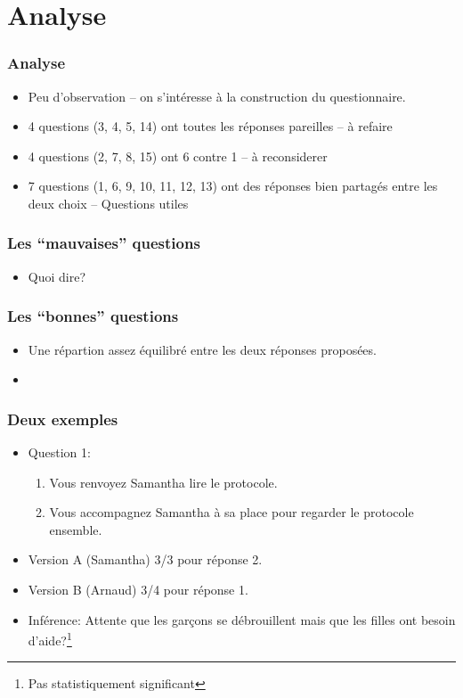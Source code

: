 \documentclass{beamer}
\begin{document}
\section{Analyse}
\begin{frame}
  \frametitle{Analyse}
  \begin{itemize}
  \item Peu d'observation -- on s'intéresse à la construction du questionnaire.
  \item 4 questions (3, 4, 5, 14) ont toutes les réponses pareilles -- à refaire
  \item 4 questions (2, 7, 8, 15) ont 6 contre 1 -- à reconsiderer
  \item 7 questions (1, 6, 9, 10, 11, 12, 13) ont des réponses bien partagés
    entre les deux choix -- Questions utiles
  \end{itemize}
\end{frame}

\begin{frame}
  \frametitle{Les ``mauvaises'' questions}
  \begin{itemize}
  \item Quoi dire?
  \end{itemize}
\end{frame}

\begin{frame}
  \frametitle{Les ``bonnes'' questions}
  \begin{itemize}
  \item Une répartion assez équilibré entre les deux réponses proposées.
  \item 
  \end{itemize}
\end{frame}

\begin{frame}
  \frametitle{Deux exemples}
  \begin{itemize}
  \item Question 1:
    \begin{enumerate}
    \item Vous renvoyez Samantha lire le protocole. 
    \item Vous accompagnez Samantha à sa place pour regarder le protocole ensemble. 
    \end{enumerate}
  \item Version A (Samantha) 3/3 pour réponse 2.
  \item Version B (Arnaud) 3/4 pour réponse 1.
  \item Inférence: Attente que les garçons se débrouillent mais que les filles ont
    besoin d'aide?\footnote{Pas statistiquement significant} 
  \end{itemize}
\end{frame}
\end{document}
